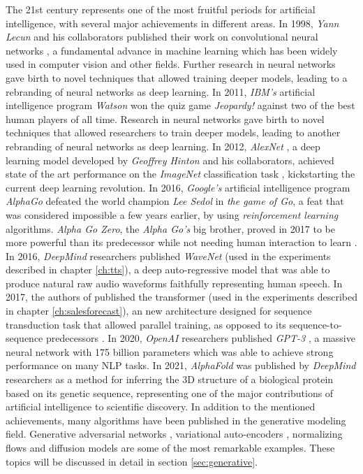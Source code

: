 The 21st century represents one of the most fruitful periods for artificial intelligence, with several major achievements in different areas. In 1998, \textit{Yann Lecun} and his collaborators published their work on convolutional neural networks \autocite{lecun1999}, a fundamental advance in machine learning which has been widely used in computer vision and other fields. Further research in neural networks \autocite{hinton2006, hinton2012} gave birth to novel techniques that allowed training deeper models, leading to a rebranding of neural networks as deep learning. In 2011, \textit{IBM's} artificial intelligence program \textit{Watson} won the quiz game \textit{Jeopardy!} against two of the best human players of all time. Research in neural networks gave birth to novel techniques that allowed researchers to train deeper models, leading to another rebranding of neural networks as deep learning. In 2012, \textit{AlexNet} \autocite{krizhevsky2012}, a deep learning model developed by \textit{Geoffrey Hinton} and his collaborators, achieved state of the art performance on the \textit{ImageNet} classification task \autocite{ILSVRC15}, kickstarting the current deep learning revolution. In 2016, \textit{Google's} artificial intelligence program \textit{AlphaGo} \autocite{silver2016} defeated the world champion \textit{Lee Sedol} in \textit{the game of Go}, a feat that was considered impossible a few years earlier, by using \textit{reinforcement learning} algorithms. \textit{Alpha Go Zero}, the \textit{Alpha Go's} big brother, proved in 2017 to be more powerful than its predecessor while not needing human interaction to learn \autocite{Silver2017a, Silver2017b}. In 2016, \textit{DeepMind} researchers published \textit{WaveNet} \autocite{vanderoord2016} (used in the experiments described in chapter \ref{ch:tts}), a deep auto-regressive model that was able to produce natural raw audio waveforms faithfully representing human speech. In 2017, the authors of \autocite{vaswani2017} published the transformer (used in the experiments described in chapter \ref{ch:salesforecast}), an new architecture designed for sequence transduction task that allowed parallel training, as opposed to its sequence-to-sequence predecessors \autocite{sutskever2014}. In 2020, \textit{OpenAI} researchers published \textit{GPT-3} \autocite{brown2020}, a massive neural network with 175 billion parameters which was able to achieve strong performance on many NLP tasks. In 2021, \textit{AlphaFold} was published by \textit{DeepMind} researchers \autocite{Jumper2021} as a method for inferring the 3D structure of a biological protein based on its genetic sequence, representing one of the major contributions of artificial intelligence to scientific discovery. In addition to the mentioned achievements, many algorithms have been published in the generative modeling field. Generative adversarial networks \autocite{Goodfellow2014}, variational auto-encoders \autocite{kingma2019}, normalizing flows \autocite{kingma2016, kobyzev} and diffusion models \autocite{Prafulla2021} are some of the most remarkable examples. These topics will be discussed in detail in section \ref{sec:generative}.

